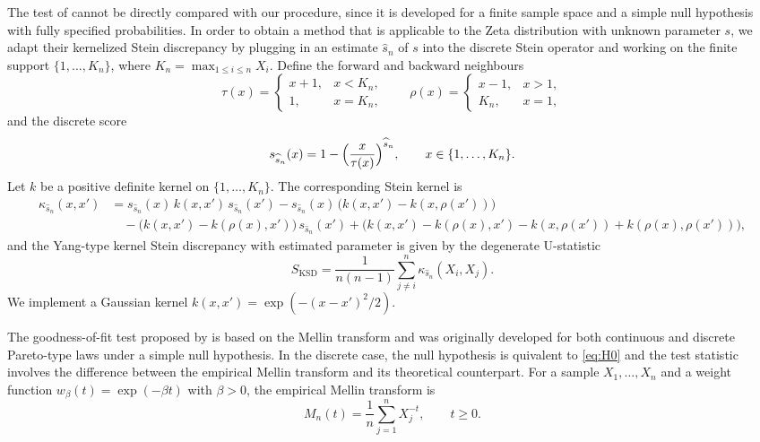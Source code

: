 \documentclass{article}
\theoremstyle{thm}
\theoremstyle{def}
\begin{document}
The test of \citet{Yang:2018} cannot be directly compared with our procedure, since it is
developed for a finite sample space and a simple null hypothesis with fully specified
probabilities. In order to obtain a method that is applicable to the Zeta distribution with
unknown parameter $s$, we adapt their kernelized Stein discrepancy by plugging in an
estimate $\widehat{s}_n$ of $s$ into the discrete Stein operator and working on the finite
support $\{1,\dots,K_n\}$, where $K_n = \max_{1\le i\le n} X_i$. Define the forward and
backward neighbours
\[
  \tau(x) =
  \begin{cases}
    x+1, & x < K_n,\\
    1,   & x = K_n,
  \end{cases}
  \qquad
  \rho(x) =
  \begin{cases}
    x-1, & x > 1,\\
    K_n, & x = 1,
  \end{cases}
\]
and the discrete score
\[
  s_{\widehat{s}_n}(x)
  = 1 - \Bigl(\frac{x}{\tau(x)}\Bigr)^{\widehat{s}_n}, \qquad x\in\{1,\dots,K_n\}.
\]
Let $k$ be a positive definite kernel on $\{1,\dots,K_n\}$. The corresponding Stein
kernel is
\[
\begin{aligned}
  \kappa_{\widehat{s}_n}(x,x')
  &= s_{\widehat{s}_n}(x)\,k(x,x')\,s_{\widehat{s}_n}(x')
   - s_{\widehat{s}_n}(x)\,\bigl(k(x,x') - k(x,\rho(x'))\bigr) \\
  &\quad
   - \bigl(k(x,x') - k(\rho(x),x')\bigr)\,s_{\widehat{s}_n}(x')
   + \bigl(k(x,x') - k(\rho(x),x') - k(x,\rho(x')) + k(\rho(x),\rho(x'))\bigr),
\end{aligned}
\]
and the Yang-type kernel Stein discrepancy with estimated parameter is given by the
degenerate U-statistic
\begin{equation}\label{eq:test_Yang18}
  S_{\mathrm{KSD}}
  = \frac{1}{n(n-1)} \sum_{j\neq i}^n
      \kappa_{\widehat{s}_n}(X_i,X_j).
\end{equation}
We implement a Gaussian kernel $k(x,x')=\exp(- (x-x')^2/2)$.

The goodness-of-fit test proposed by \citet{M:2009} is based on the Mellin
transform and was originally developed for both continuous and discrete Pareto-type
laws under a simple null hypothesis. In the discrete case, the null hypothesis is quivalent to \eqref{eq:H0} and the test statistic involves the difference between the empirical Mellin transform and
its theoretical counterpart. For a sample $X_1,\dots,X_n$ and a weight function
$w_\beta(t) = \exp(-\beta t)$ with $\beta>0$, the empirical Mellin transform is
\[
  M_n(t) = \frac{1}{n}\sum_{j=1}^n X_j^{-t}, \qquad t\ge 0.
\]
\end{document}

